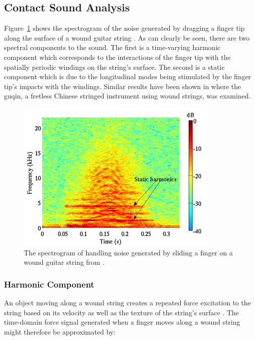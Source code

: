 \documentclass[main.tex]{subfiles}
\begin{document}
\subsection{Contact Sound Analysis}
Figure~\ref{fig:finger_noise_spectrogram} shows the spectrogram of the noise generated by dragging a finger tip along the surface of a wound guitar string . As can clearly be seen, there are two spectral components to the sound. The first is a time-varying harmonic component which corresponds to the interactions of the finger tip with the spatially periodic windings on the string's surface. The second is a static component which is due to the longitudinal modes being stimulated by the finger tip's impacts with the windings. Similar results have been shown in  where the guqin, a fretless Chinese stringed instrument using wound strings, was examined.

\begin{figure}[h]
    \centering
    \includegraphics[scale=1]{./images/pictures/finger-noise-spectrogram.png}
    \caption{The spectrogram of handling noise generated by sliding a finger on a wound guitar string from .}
    \label{fig:finger_noise_spectrogram}
\end{figure}

\subsubsection{Harmonic Component}
An object moving along a wound string creates a repeated force excitation to the string based on its velocity as well as the texture of the string's surface . The time-domain force signal generated when a finger moves along a wound string might therefore be approximated by:
\end{document}

